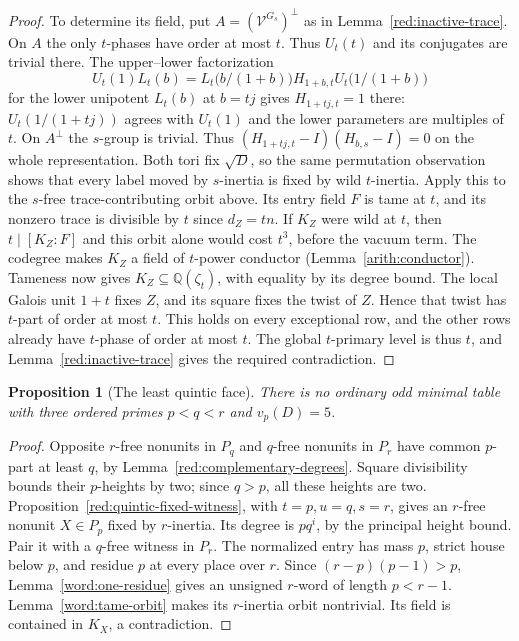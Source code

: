 \documentclass[11pt,a4paper]{article}
\numberwithin{equation}{section}
\newtheorem{proposition}[theorem]{Proposition}
\newcommand{\QQ}{\mathbb Q}
\begin{document}
\begin{proof}
To determine its field, put $A=(\mathcal V^{G_s})^\perp$ as in
Lemma~\ref{red:inactive-trace}.
On $A$ the only $t$-phases have order at most $t$. Thus $U_t(t)$
and its conjugates are trivial there. The upper--lower
factorization
\[
 U_t(1)L_t(b)=L_t\bigl(b/(1+b)\bigr)H_{1+b,t}U_t\bigl(1/(1+b)\bigr)
\]
for the lower unipotent $L_t(b)$ at $b=tj$ gives $H_{1+tj,t}=1$ there:
$U_t(1/(1+tj))$ agrees with $U_t(1)$ and the lower parameters
are multiples of $t$. On $A^\perp$ the $s$-group is trivial.
Thus $(H_{1+tj,t}-I)(H_{b,s}-I)=0$ on the whole representation.
Both tori fix $\sqrt D$, so the same permutation observation
shows that every label moved by $s$-inertia is fixed by wild
$t$-inertia. Apply this to
the $s$-free trace-contributing orbit above. Its entry field $F$
is tame at $t$, and its nonzero trace is divisible by $t$ since
$d_Z=tn$. If $K_Z$ were wild at $t$, then $t\mid[K_Z:F]$ and
this orbit alone would cost $t^3$, before the vacuum term.
The codegree makes $K_Z$ a field of $t$-power conductor
(Lemma~\ref{arith:conductor}). Tameness now gives
$K_Z\subseteq\QQ(\zeta_t)$,
with equality by its degree bound. The local Galois unit $1+t$
fixes $Z$, and its square fixes the twist of $Z$. Hence that
twist has $t$-part of order at most $t$. This holds on every
exceptional row, and the other rows already have $t$-phase of
order at most $t$. The global $t$-primary level is thus $t$,
and Lemma~\ref{red:inactive-trace} gives the required contradiction.
\end{proof}

\begin{proposition}[The least quintic face]\label{red:least-quintic}
There is no ordinary odd minimal table with three ordered primes
\(p<q<r\) and \(v_p(D)=5\).
\end{proposition}
\begin{proof}
Opposite \(r\)-free nonunits in \(P_q\) and \(q\)-free nonunits
in \(P_r\) have common \(p\)-part at least \(q\), by
Lemma~\ref{red:complementary-degrees}.  Square divisibility bounds their
\(p\)-heights by two; since \(q>p\), all these heights are two.
Proposition~\ref{red:quintic-fixed-witness}, with \(t=p,u=q,s=r\), gives
an \(r\)-free nonunit \(X\in P_p\) fixed by \(r\)-inertia.
Its degree is \(pq^i\), by the principal height bound.
Pair it with a \(q\)-free witness in \(P_r\).
The normalized entry has mass \(p\), strict house below \(p\),
and residue \(p\) at every place over \(r\).
Since \((r-p)(p-1)>p\), Lemma~\ref{word:one-residue}
gives an unsigned \(r\)-word of length \(p<r-1\).
Lemma~\ref{word:tame-orbit} makes its \(r\)-inertia orbit
nontrivial.  Its field is contained in \(K_X\), a contradiction.
\end{proof}
\end{document}
